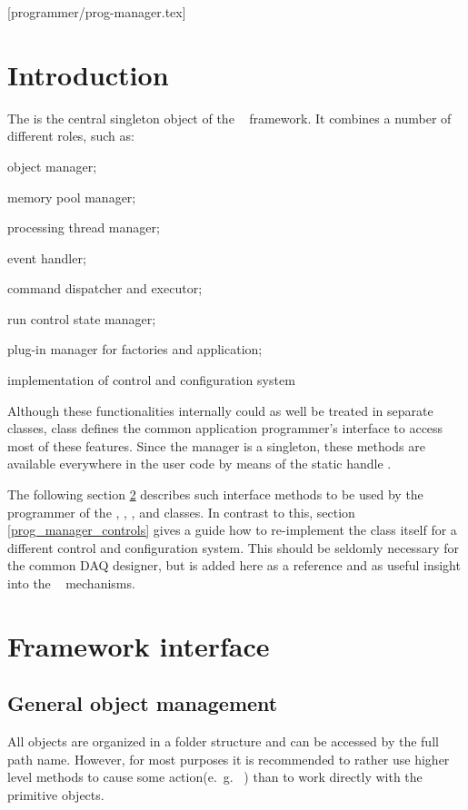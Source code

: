 [programmer/prog-manager.tex]

\section{Introduction}
The  is the central singleton object of the
\dabc~ framework. 
It combines a number of different roles, such as:

\bcir
\item object manager;
\item memory pool manager;
\item processing thread manager;
\item event handler;
\item command dispatcher and executor;
\item run control state manager;
\item plug-in manager for factories and application;
\item implementation of control and configuration system
\ecir

Although these functionalities internally could as well be treated in
separate classes,  class defines the common
application programmer's interface to access most of these features.
Since the manager is a singleton,
these methods are available everywhere in the user code
by means of the static handle .


The following section \ref{prog_manager_framework} describes such interface methods to
be used by the programmer of the , , , and  classes.
In contrast to this, section \ref{prog_manager_controls} gives a guide how to
re-implement the  class itself for a different control and configuration
system. This should be seldomly  necessary for the common DAQ designer, 
but is added here as a reference and as useful insight into the \dabc~ mechanisms.


\section{Framework interface}
\label{prog_manager_framework}

\subsection{General object management}
\label{prog_manager_framework_objects}
All objects are organized in a folder structure and can be accessed
by the full path name. However, for most purposes it is recommended
to rather use higher level  methods to cause some
action(e.~g.~ ) than to work directly with the
primitive objects. 

